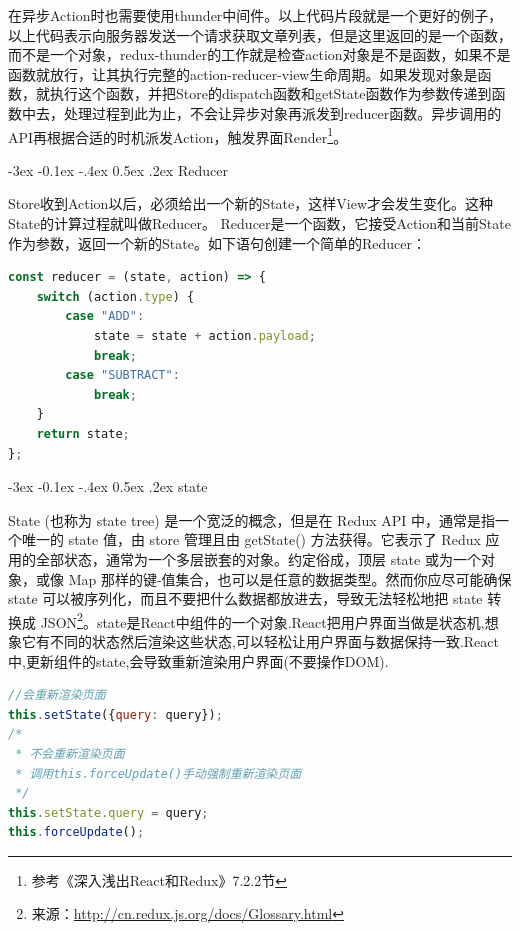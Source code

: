 \documentclass[12pt]{book}
\makeatletter
\numberwithin{dummy}{section}
\theoremstyle{ocrenumbox}
\theoremstyle{blacknumex}
\theoremstyle{blacknumbox}
\theoremstyle{ocrenum}
\renewcommand{\subsection}{\@startsection {subsection}{2}{\z@}
	{-3ex \@plus -0.1ex \@minus -.4ex}
	{0.5ex \@plus.2ex }
	{\normalfont\sffamily\bfseries}}
\makeatother
\begin{document}
在异步Action时也需要使用thunder中间件。以上代码片段就是一个更好的例子，以上代码表示向服务器发送一个请求获取文章列表，但是这里返回的是一个函数，而不是一个对象，redux-thunder的工作就是检查action对象是不是函数，如果不是函数就放行，让其执行完整的action-reducer-view生命周期。如果发现对象是函数，就执行这个函数，并把Store的dispatch函数和getState函数作为参数传递到函数中去，处理过程到此为止，不会让异步对象再派发到reducer函数。异步调用的API再根据合适的时机派发Action，触发界面Render\footnote{参考《深入浅出React和Redux》7.2.2节}。

\subsection{Reducer}

Store收到Action以后，必须给出一个新的State，这样View才会发生变化。这种State的计算过程就叫做Reducer。
Reducer是一个函数，它接受Action和当前State作为参数，返回一个新的State。如下语句创建一个简单的Reducer：

\begin{lstlisting}[language=Javascript]
const reducer = (state, action) => {
	switch (action.type) {
		case "ADD":
			state = state + action.payload;
			break;
		case "SUBTRACT":
			break;
	}
	return state;
};
\end{lstlisting}

\subsection{state}

State (也称为 state tree) 是一个宽泛的概念，但是在 Redux API 中，通常是指一个唯一的 state 值，由 store 管理且由 getState() 方法获得。它表示了 Redux 应用的全部状态，通常为一个多层嵌套的对象。约定俗成，顶层 state 或为一个对象，或像 Map 那样的键-值集合，也可以是任意的数据类型。然而你应尽可能确保 state 可以被序列化，而且不要把什么数据都放进去，导致无法轻松地把 state 转换成 JSON\footnote{来源：\url{http://cn.redux.js.org/docs/Glossary.html}}。state是React中组件的一个对象.React把用户界面当做是状态机,想象它有不同的状态然后渲染这些状态,可以轻松让用户界面与数据保持一致.React中,更新组件的state,会导致重新渲染用户界面(不要操作DOM).

\begin{lstlisting}[language=Javascript]
//会重新渲染页面
this.setState({query: query});
/*
 * 不会重新渲染页面
 * 调用this.forceUpdate()手动强制重新渲染页面
 */
this.setState.query = query;
this.forceUpdate();
\end{lstlisting}
\end{document}
